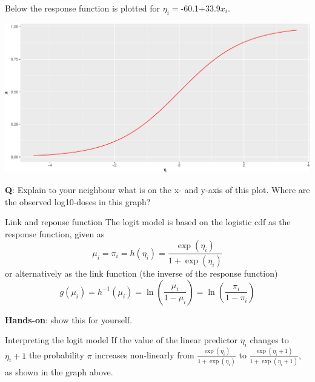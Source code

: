 \documentclass[
  ignorenonframetext,
]{beamer}
\begin{document}
\begin{frame}
Below the response function is plotted for \(\eta_i=\)-60.1+33.9\(x_i\).

\includegraphics{Module03PresentationWeek1_files/figure-beamer/unnamed-chunk-5-1.pdf}

\textbf{Q}: Explain to your neighbour what is on the x- and y-axis of
this plot. Where are the observed log10-doses in this graph?
\end{frame}

\begin{frame}
\begin{block}{Link and reponse function}
\protect\hypertarget{link-and-reponse-function}{}
The logit model is based on the logistic cdf as the response function,
given as \[ \mu_i=\pi_i=h(\eta_i)=\frac{\exp(\eta_i)}{1+\exp(\eta_i)}\]
or alternatively as the link function (the inverse of the response
function)
\[ g(\mu_i)=h^{-1}(\mu_i)=\ln(\frac{\mu_i}{1-\mu_i})=\ln(\frac{\pi_i}{1-\pi_i})\]

\textbf{Hands-on}: show this for yourself.
\end{block}
\end{frame}

\begin{frame}
\begin{block}{Interpreting the logit model}
\protect\hypertarget{interpreting-the-logit-model}{}
If the value of the linear predictor \(\eta_i\) changes to \(\eta_i+1\)
the probability \(\pi\) increases non-linearly from
\(\frac{\exp(\eta_i)}{1+\exp(\eta_i)}\) to
\(\frac{\exp(\eta_i+1)}{1+\exp(\eta_i+1)}\), as shown in the graph
above.
\end{block}
\end{frame}
\end{document}
